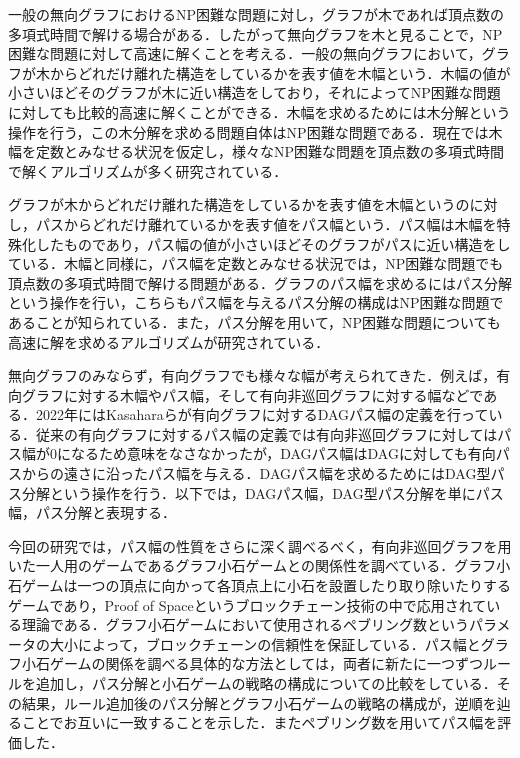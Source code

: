 \documentclass{kuisthesis}           %
\date{2023年1月31日}				%
\begin{document}
\maketitle					%



\begin{jabstract}
一般の無向グラフにおけるNP困難な問題に対し，グラフが木であれば頂点数の多項式時間で解ける場合がある．したがって無向グラフを木と見ることで，NP困難な問題に対して高速に解くことを考える．一般の無向グラフにおいて，グラフが木からどれだけ離れた構造をしているかを表す値を木幅という．木幅の値が小さいほどそのグラフが木に近い構造をしており，それによってNP困難な問題に対しても比較的高速に解くことができる．木幅を求めるためには木分解という操作を行う，この木分解を求める問題自体はNP困難な問題である．現在では木幅を定数とみなせる状況を仮定し，様々なNP困難な問題を頂点数の多項式時間で解くアルゴリズムが多く研究されている．

グラフが木からどれだけ離れた構造をしているかを表す値を木幅というのに対し，パスからどれだけ離れているかを表す値をパス幅という．パス幅は木幅を特殊化したものであり，パス幅の値が小さいほどそのグラフがパスに近い構造をしている．木幅と同様に，パス幅を定数とみなせる状況では，NP困難な問題でも頂点数の多項式時間で解ける問題がある．グラフのパス幅を求めるにはパス分解という操作を行い，こちらもパス幅を与えるパス分解の構成はNP困難な問題であることが知られている．また，パス分解を用いて，NP困難な問題についても高速に解を求めるアルゴリズムが研究されている．

無向グラフのみならず，有向グラフでも様々な幅が考えられてきた．例えば，有向グラフに対する木幅やパス幅，そして有向非巡回グラフに対する幅などである．2022年にはKasaharaらが有向グラフに対するDAGパス幅の定義を行っている．従来の有向グラフに対するパス幅の定義では有向非巡回グラフに対してはパス幅が0になるため意味をなさなかったが，DAGパス幅はDAGに対しても有向パスからの遠さに沿ったパス幅を与える．DAGパス幅を求めるためにはDAG型パス分解という操作を行う．以下では，DAGパス幅，DAG型パス分解を単にパス幅，パス分解と表現する．


今回の研究では，パス幅の性質をさらに深く調べるべく，有向非巡回グラフを用いた一人用のゲームであるグラフ小石ゲームとの関係性を調べている．グラフ小石ゲームは一つの頂点に向かって各頂点上に小石を設置したり取り除いたりするゲームであり，Proof of Spaceというブロックチェーン技術の中で応用されている理論である．グラフ小石ゲームにおいて使用されるペブリング数というパラメータの大小によって，ブロックチェーンの信頼性を保証している．パス幅とグラフ小石ゲームの関係を調べる具体的な方法としては，両者に新たに一つずつルールを追加し，パス分解と小石ゲームの戦略の構成についての比較をしている．その結果，ルール追加後のパス分解とグラフ小石ゲームの戦略の構成が，逆順を辿ることでお互いに一致することを示した．またペブリング数を用いてパス幅を評価した．


\end{jabstract}
\end{document}
